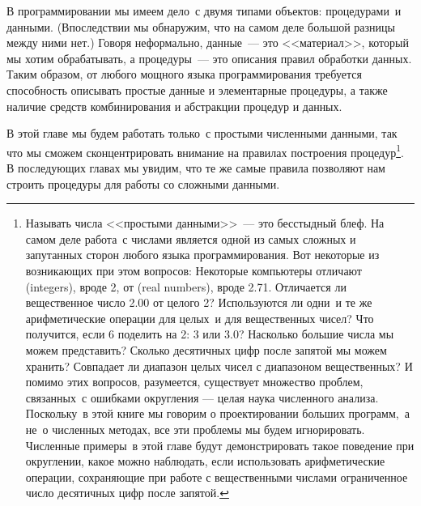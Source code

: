 В программировании мы имеем дело~с двумя типами объектов:
процедурами~и данными.  (Впоследствии мы обнаружим, что на самом деле большой
разницы между ними нет.)  Говоря неформально, данные~--- это
<<материал>>, который мы хотим обрабатывать, а процедуры~--- это
описания правил обработки данных.  Таким образом, от любого мощного языка
программирования требуется способность описывать простые данные и
элементарные процедуры, а также наличие средств
комбинирования и абстракции процедур и данных.

В этой главе мы будем работать только~с простыми 
численными данными, так что мы сможем сконцентрировать внимание на
правилах построения процедур\footnote{Называть числа <<простыми данными>>~--- это бесстыдный 
блеф.  На самом деле работа~с числами является одной из самых сложных
и запутанных сторон любого языка программирования. Вот некоторые из
возникающих при этом вопросов: Некоторые компьютеры отличают
 (integers), вроде 2, от
 (real numbers), вроде 2.71.
Отличается ли вещественное число 2.00 от целого 2?  Используются ли
одни~и те же арифметические операции для целых~и для вещественных
чисел?  Что получится, если 6 поделить на 2: 3 или 3.0? Насколько
большие числа мы можем представить?  Сколько десятичных цифр после
запятой мы можем хранить?  Совпадает ли диапазон целых чисел с
диапазоном вещественных? И помимо этих вопросов, разумеется,
существует множество проблем, связанных~с 
ошибками округления --- целая наука 
численного анализа.  
Поскольку~в этой книге мы говорим о
проектировании больших программ,~а не~о численных методах, все эти
проблемы мы будем игнорировать.  Численные примеры~в этой главе будут
демонстрировать такое поведение при округлении, какое можно наблюдать, 
если использовать арифметические операции, сохраняющие при работе с
вещественными числами ограниченное число десятичных цифр после
запятой.
}.
В последующих главах мы увидим, что те же самые правила позволяют
нам строить процедуры для работы со сложными данными.

